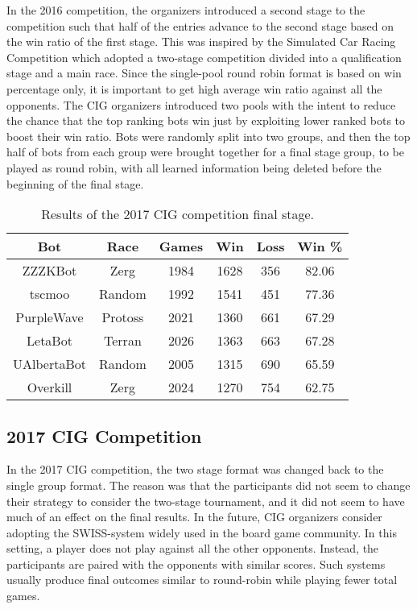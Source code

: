 In the 2016 competition, the organizers introduced a second stage to the competition such that half of the entries advance to the second stage based on the win ratio of the first stage. This was inspired by the Simulated Car Racing Competition \cite{loiacono20102009} which adopted a two-stage competition divided into a qualification stage and a main race. Since the single-pool round robin format is based on win percentage only, it is important to get high average win ratio against all the opponents. The CIG organizers introduced two pools with the intent to reduce the chance that the top ranking bots win just by exploiting lower ranked bots to boost their win ratio. Bots were randomly split into two groups, and then the top half of bots from each group were brought together for a final stage group, to be played as round robin, with all learned information being deleted before the beginning of the final stage. 

\begin{table}[t]
\begin{center}
	\begin{tabular}{| c | c | c | c | c | c |}
		\hline
		\textbf{Bot} & \textbf{Race} & \textbf{Games} & \textbf{Win} & \textbf{Loss} & \textbf{Win \%} \\
		\hline
		ZZZKBot & Zerg & 1984 & 1628 & 356 & 82.06 \\
		\hline
		tscmoo & Random & 1992 & 1541 & 451 & 77.36 \\
		\hline
		PurpleWave & Protoss & 2021 & 1360 & 661 & 67.29 \\
		\hline
		LetaBot & Terran & 2026 & 1363 & 663 & 67.28 \\
		\hline
		UAlbertaBot & Random & 2005 & 1315 & 690 & 65.59 \\
		\hline
		Overkill & Zerg & 2024 & 1270 & 754 & 62.75 \\
		\hline
 \end{tabular}
 \end{center}  
 \caption{Results of the 2017 CIG competition final stage.}
 \label{tableCIG}
\end{table}

\subsection{2017 CIG Competition}\label{subsecCIGnews}


In the 2017 CIG competition, the two stage format was changed back to the single group format. The reason was that the participants did not seem to change their strategy to consider the two-stage tournament, and it did not seem to have much of an effect on the final results. In the future, CIG organizers consider adopting the SWISS-system widely used in the board game community. In this setting, a player does not play against all the other opponents. Instead, the participants are paired with the opponents with similar scores. Such systems usually produce final outcomes similar to round-robin while playing fewer total games. 

